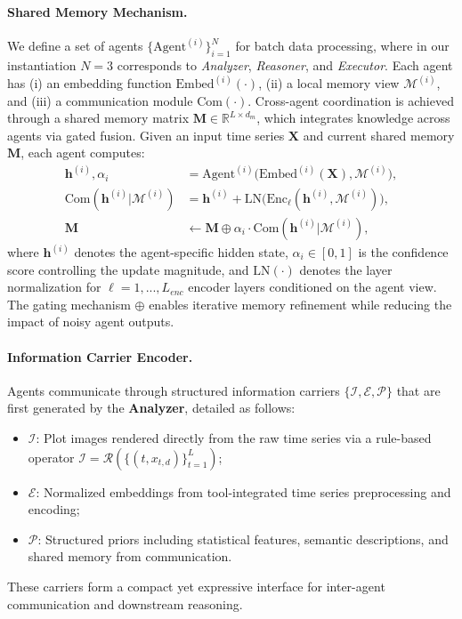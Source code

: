 \paragraph{Shared Memory Mechanism.}
We define a set of agents $\{\text{Agent}^{(i)}\}_{i=1}^{N}$ for batch data processing, where in our instantiation $N{=}3$ corresponds to \emph{Analyzer}, \emph{Reasoner}, and \emph{Executor}.
Each agent has (i) an embedding function $\text{Embed}^{(i)}(\cdot)$, (ii) a local memory view $\mathcal{M}^{(i)}$, and (iii) a communication module $\text{Com}(\cdot)$.
Cross-agent coordination is achieved through a shared memory matrix $\mathbf{M} \in \mathbb{R}^{L \times d_m}$, which integrates knowledge across agents via gated fusion.
Given an input time series $\mathbf{X}$ and current shared memory $\mathbf{M}$, each agent computes:
\begin{align}
\mathbf{h}^{(i)},\alpha_i &= \text{Agent}^{(i)}\big(\text{Embed}^{(i)}(\mathbf{X}), \mathcal{M}^{(i)}\big),\\
\text{Com}(\mathbf{h}^{(i)}|\mathcal{M}^{(i)}) &= \mathbf{h}^{(i)} + \text{LN}\Big(\text{Enc}_{\ell}(\mathbf{h}^{(i)}, \mathcal{M}^{(i)})\Big),\\
\mathbf{M} &\leftarrow \mathbf{M} \oplus \alpha_i \cdot \text{Com}(\mathbf{h}^{(i)}|\mathcal{M}^{(i)}),
\end{align}
where $\mathbf{h}^{(i)}$ denotes the agent-specific hidden state, $\alpha_i\in[0,1]$ is the confidence score controlling the update magnitude, and $\text{LN}(\cdot)$ denotes the layer normalization for $\ell =1,...,L_{enc}$ encoder layers conditioned on the agent view.
The gating mechanism $\oplus$ enables iterative memory refinement while reducing the impact of noisy agent outputs.

\paragraph{Information Carrier Encoder.}
Agents communicate through structured information carriers $\{\mathcal{I}, \mathcal{E}, \mathcal{P}\}$ that are first generated by the \textbf{Analyzer}, detailed as follows:
\begin{itemize}[leftmargin=*, itemsep=0pt]
\item $\mathcal{I}$: Plot images rendered directly from the raw time series via a rule-based operator $\mathcal{I} = \mathcal{R}(\{(t, x_{t,d})\}_{t=1}^{L})$;
\item $\mathcal{E}$: Normalized embeddings from tool-integrated time series preprocessing and encoding;
\item $\mathcal{P}$: Structured priors including statistical features, semantic descriptions, and shared memory from communication.
\end{itemize}
These carriers form a compact yet expressive interface for inter-agent communication and downstream reasoning.

